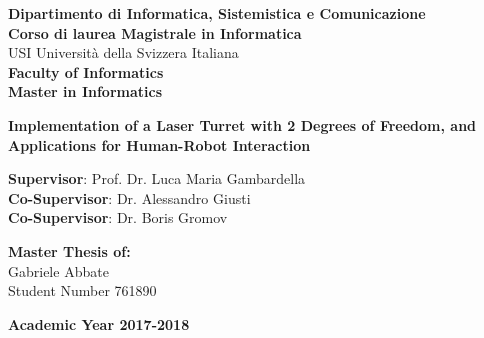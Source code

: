 \documentclass[a4paper,12pt,twoside,openright]{book}
\newcommand{\titolo}{Implementation of a Laser Turret with 2 Degrees of Freedom, and Applications for Human-Robot Interaction}
\newcommand{\autore}{Gabriele Abbate}
\newcommand{\matricola}{761890}
\newcommand{\relatore}{Prof. Dr. Luca Maria Gambardella}
\newcommand{\correlatoreA}{Dr. Alessandro Giusti}
\newcommand{\correlatoreB}{Dr. Boris Gromov}
\begin{document}
\begin{titlepage}
\begin{minipage}{0.67\linewidth}
\begin{flushleft}
			{\large \bfseries Dipartimento di Informatica, Sistemistica e Comunicazione} \\[0.4cm]
			{\large  \bfseries Corso di laurea Magistrale in Informatica}\\
			\vspace*{1.5cm}
			{\large USI Università della Svizzera Italiana} \\[0.4cm]
			{\large \bfseries Faculty of Informatics} \\[0.4cm]
			{\large  \bfseries Master in Informatics}
		\end{flushleft}
	\end{minipage}
	\begin{center}
		\vspace*{4cm}
		{ \huge \bfseries \titolo} \\[0.1cm]
	\end{center}
	\vspace*{2cm}
	\begin{flushleft}
		{\Large \textbf{Supervisor}: \relatore} \\[0.4cm]
		{\Large \textbf{Co-Supervisor}: \correlatoreA} \\[0.4cm]
		{\Large \textbf{Co-Supervisor}: \correlatoreB} \\[0.4cm]
	\end{flushleft}
	\vspace*{2cm}
	\begin{flushright}
		{\Large \textbf{Master Thesis of:}} \\[0.4cm]
		{\Large \autore} \\[0.2cm]
		{\Large Student Number \matricola} \\
	\end{flushright}
	\vfill
	\begin{center}
		{\Large \textbf{Academic Year 2017-2018}}
		\vspace*{1cm}
	\end{center}
	
\end{titlepage}

\restoregeometry	


\end{document}
